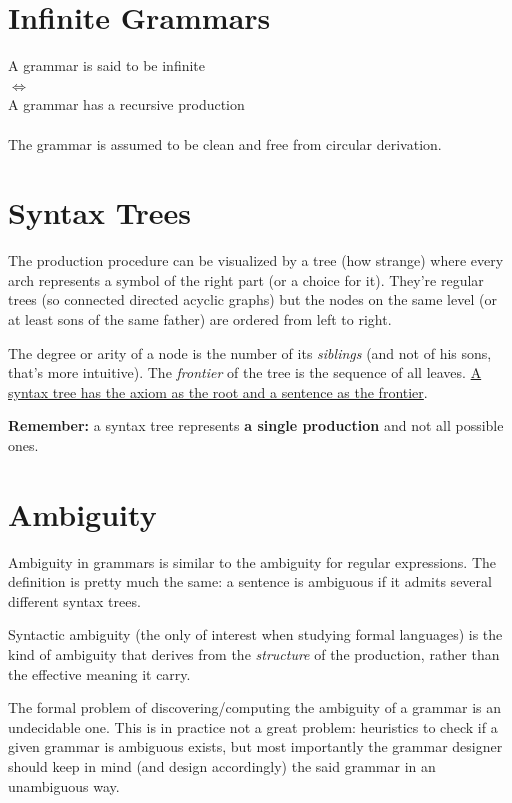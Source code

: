     \section{Infinite Grammars}
        A grammar is said to be infinite\\
        $\Leftrightarrow$\\
        A grammar has a recursive production\\\\
        The grammar is assumed to be clean and free from circular derivation. 
       
    \section{Syntax Trees}
    	The production procedure can be visualized by a tree (how strange) where every arch represents a symbol of the right part (or a choice for it). They're 
		regular trees (so connected directed acyclic graphs) but the nodes on the same level (or at least sons of the same father) are ordered from left to right.

    	The degree or arity of a node is the number of its \emph{siblings} (and not of his sons, that's more intuitive). The \emph{frontier} of the tree is the 
		sequence of all leaves. \underline{A syntax tree has the axiom as the root and a sentence as the frontier}.

    	\textbf{Remember:} a syntax tree represents \textbf{a single production} and not all possible ones.
	
	\section{Ambiguity}
		Ambiguity in grammars is similar to the ambiguity for regular expressions. The definition is pretty much the same: a sentence is ambiguous 
		if it admits several different syntax trees.

		Syntactic ambiguity (the only of interest when studying formal languages) is the kind of ambiguity that derives from the \emph{structure} of the production, 
		rather than the effective meaning it carry.%

		The formal problem of discovering/computing the ambiguity of a grammar is an undecidable one. This is in practice not a great problem: heuristics to check 
		if a given grammar is ambiguous exists, but most importantly the grammar designer should keep in mind (and design accordingly) the said grammar in an 
		unambiguous way.
		
